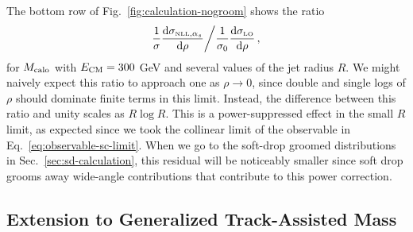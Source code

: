 \documentclass[letterpaper,11pt]{article}
\newcommand{\Fig}[1]{Fig.~\ref{#1}}
\newcommand{\Sec}[1]{Sec.~\ref{#1}}
\newcommand{\Eq}[1]{Eq.~\eqref{#1}}
\begin{document}
The bottom row of \Fig{fig:calculation-nogroom} shows the ratio
\begin{equation}
\frac{1}{\sigma} \frac{\text{d}\sigma_{\mbox{\tiny NLL},\alpha_s}}{\text{d}\rho}\bigg/ \frac{1}{\sigma_0} \frac{\text{d}\sigma_{\mbox{\tiny LO}}}{\text{d}\rho} \,,
\end{equation}
for $M_{\rm calo}$ with $E_{\rm CM} = 300$ GeV and several values of the jet radius $R$. 
%
We might naively expect this ratio to approach one as $\rho \rightarrow 0$, since double and single logs of $\rho$ should dominate finite terms in this limit.
%
Instead, the difference between this ratio and unity scales as $R\log R $.
%
This is a power-suppressed effect in the small $R$ limit, as expected since we took the collinear limit of the observable in \Eq{eq:observable-sc-limit}.
%
When we go to the soft-drop groomed distributions in \Sec{sec:sd-calculation}, this residual will be noticeably smaller since soft drop grooms away wide-angle contributions that contribute to this power correction.












\subsection{Extension to Generalized Track-Assisted Mass}
\label{sec:calculation-gtam}
\end{document}
